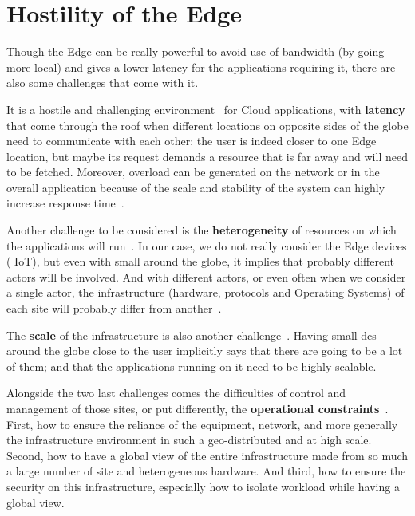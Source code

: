 \section{Hostility of the Edge} %
\label{sec:edge-chal}




Though the Edge can be really powerful to avoid use of bandwidth (by
going more local) and gives a lower latency for the applications
requiring it, there are also some challenges that come with it.

It is a hostile and challenging environment~\cite{MZCBT22, VWBKN16}
for Cloud applications, with \textbf{latency} that come through the
roof when different locations on opposite sides of the globe need to
communicate with each other: the user is indeed closer to one Edge
location, but maybe its request demands a resource that is far away
and will need to be fetched.
%
Moreover, overload can be generated on the network or in the
overall application because of the scale and stability of the system
can highly increase response time~\cite{platform9-latency, SCZKX16}.


Another challenge to be considered is the \textbf{heterogeneity} of
resources on which the applications will run~\cite{HoBl19}.
%
In our case, we do not really consider the Edge devices (\eg
\acrshort{IoT}), but even with small \dcs around the globe, it
implies that probably different actors will be involved.
%
And with different actors, or even often when we consider a single
actor, the infrastructure (hardware, protocols and Operating Systems)
of each site will probably differ from another~\cite{XJLC+19, SCZKX16}.

The \textbf{scale} of the infrastructure is also another
challenge~\cite{edge-challenges, mirantis-edge-challenges}.
%
Having small \glspl{dc} around the globe close to the user
implicitly says that there are going to be a lot of them; and that
the applications running on it need to be highly scalable.


Alongside the two last challenges comes the difficulties of control
and management of those sites, or put differently, the
\textbf{operational constraints}~\cite{edge-challenges, SCZKX16}.
%
First, how to ensure the reliance of the equipment, network, and more
generally the infrastructure environment in such a geo-distributed and
at high scale.
%
Second, how to have a global view of the entire infrastructure
made from so much a large number of site and heterogeneous hardware.
%
And third, how to ensure the security on this infrastructure,
especially how to isolate workload while having a global view.


